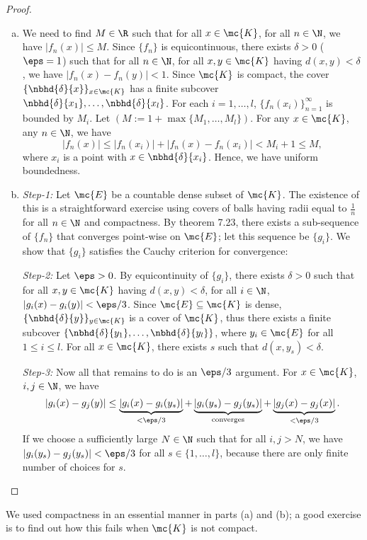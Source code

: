 \begin{proof}
	\begin{enumerate}[(a)]
		\item We need to find \(M\in\R\) such that for all \(x\in\mc{K}\), for all \(n\in\N\), we have \(|f_n(x)|\leq M\). Since \(\{f_n\}\) is equicontinuous, there exists \(\delta>0\) (\(\eps=1\)) such that for all \(n\in\N\), for all \(x,y\in\mc{K}\) having \(d(x,y)<\delta\), we have \(|f_n(x)-f_n(y)|<1\). Since \(\mc{K}\) is compact, the cover \(\{\nbhd{\delta}{x}\}_{x\in\mc{K}}\) has a finite subcover \(\nbhd{\delta}{x_1},\dots,\nbhd{\delta}{x_l}\). For each \(i=1,\dots,l\), \(\{f_n(x_i)\}_{n=1}^{\infty}\) is bounded by \(M_i\). Let \((M:=1+\max\{M_1,\dots,M_l\})\). For any \(x\in\mc{K}\), any \(n\in\N\), we have 
		\begin{equation*}
			|f_n(x)|\leq |f_n(x_i)|+|f_n(x)-f_n(x_i)|<M_i+1\leq M,
		\end{equation*}
		where \(x_i\) is a point with \(x\in\nbhd{\delta}{x_i}\). Hence, we have uniform boundedness.
		
		\item \emph{Step-1:} Let \(\mc{E}\) be a countable dense subset of \(\mc{K}\). The existence of this is a straightforward exercise using covers of balls having radii equal to \(\displaystyle\frac{1}{n}\) for all \(n\in\N\) and compactness. By theorem 7.23, there exists a sub-sequence of \(\{f_n\}\) that converges point-wise on \(\mc{E}\); let this sequence be \(\{g_i\}\). We show that \(\{g_i\}\) satisfies the Cauchy criterion for convergence:
		
		\medskip
		
		\emph{Step-2:} Let \(\eps>0\). By equicontinuity of \(\{g_i\}\), there exists \(\delta>0\) such that for all \(x,y\in\mc{K}\) having \(d(x,y)<\delta\), for all \(i\in\N\), \(|g_i(x)-g_i(y)|<\eps/3\). Since \(\mc{E}\subseteq\mc{K}\) is dense, \(\{{\nbhd{\delta}{y}}\}_{y\in\mc{K}}\) is a cover of \(\mc{K}\), thus there exists a finite subcover \(\{\nbhd{\delta}{y_1},\dots,\nbhd{\delta}{y_l}\}\), where \(y_i\in\mc{E}\) for all \(1\leq i\leq l\). For all \(x\in\mc{K}\), there exists \(s\) such that \(d(x,y_s)<\delta\).
		
		\medskip
		
		\emph{Step-3:} Now all that remains to do is an \(\eps/3\) argument. For \(x\in\mc{K}\), \(i,j\in\N\), we have 
		\begin{equation*}
			|g_i(x)-g_j(y)|\leq \underbrace{|g_i(x)-g_i(y_s)|}_{<\eps/3}+\underbrace{|g_i(y_s)-g_j(y_s)|}_{\text{converges}}+\underbrace{|g_j(x)-g_j(x)|}_{<\eps/3}.
		\end{equation*}
		If we choose a sufficiently large \(N\in\N\) such that for all \(i,j>N\), we have \(|g_i(y_s)-g_j(y_s)|<\eps/3\) for all \(s\in\{1,\dots,l\}\), because there are only finite number of choices for \(s\).
	\end{enumerate}
\end{proof}
\begin{note}
	We used compactness in an essential manner in parts (a) and (b); a good exercise is to find out how this fails when \(\mc{K}\) is not compact.
\end{note}